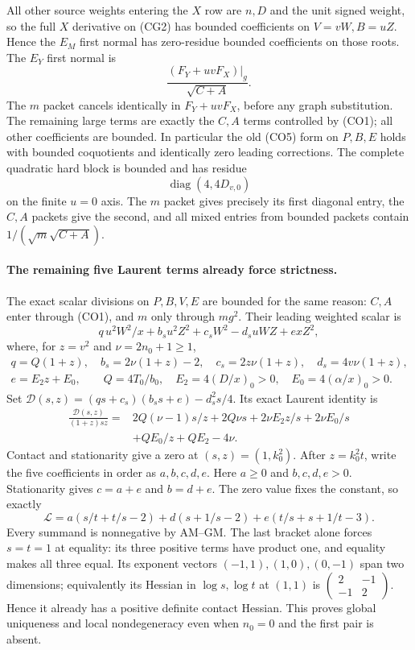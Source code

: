 All other source weights entering the $X$ row are $n,D$ and the
unit signed weight, so the full $X$ derivative on (CG2) has bounded
coefficients on $V=vW,B=uZ$.  Hence the $E_M$ first normal has
zero-residue bounded coefficients on those roots.  The $E_Y$ first
normal is
\[
       \frac{(F_Y+uvF_X)|_g}{\sqrt{C+A}}.               \tag{CG4}
\]
The $m$ packet cancels identically in $F_Y+uvF_X$, before any graph
substitution.  The remaining large terms are exactly the $C,A$
terms controlled by (CO1); all other coefficients are bounded.
In particular the old (CO5) form on $P,B,E$ holds with bounded
coquotients and identically zero leading corrections.
The complete quadratic hard block is bounded and has residue
\[
                         \operatorname{diag}(4,4D_{v,0})  \tag{CG5}
\]
on the finite $u=0$ axis.  The $m$ packet gives precisely its first
diagonal entry, the $C,A$ packets give the second, and all mixed
entries from bounded packets contain $1/(\sqrt m\sqrt{C+A})$.

\paragraph{The remaining five Laurent terms already force strictness.}
The exact scalar divisions on $P,B,V,E$ are bounded for the same
reason: $C,A$ enter through (CO1), and $m$ only through $mg^2$.
Their leading weighted scalar is
\[
 q\,u^2W^2/x+b_su^2Z^2+c_sW^2-d_suWZ+exZ^2,
\]
where, for $z=v^2$ and $\nu=2n_0+1\geq1$,
\[
 \begin{gathered}
 q=Q(1+z),\quad b_s=2\nu(1+z)-2,\quad
 c_s=2z\nu(1+z),\quad d_s=4v\nu(1+z),\\
 e=E_2z+E_0,\qquad Q=4T_0/b_0,
 \quad E_2=4(D/x)_0>0,\quad E_0=4(\alpha/x)_0>0.
 \end{gathered}                                         \tag{CG6}
\]
Set $\mathcal D(s,z)=(qs+c_s)(b_ss+e)-d_s^2s/4$.
Its exact Laurent identity is
\begin{align*}
 \frac{\mathcal D(s,z)}{(1+z)sz}={}&
 2Q(\nu-1)s/z+2Q\nu s
 +2\nu E_2z/s+2\nu E_0/s\\
 &+QE_0/z+QE_2-4\nu.                                  \tag{CG7}
\end{align*}
Contact and stationarity give a zero at $(s,z)=(1,k_0^2)$.
After $z=k_0^2t$, write the five coefficients in order as
$a,b,c,d,e$.  Here $a\geq0$ and $b,c,d,e>0$.  Stationarity gives
$c=a+e$ and $b=d+e$.  The zero value fixes the constant, so exactly
\[
 \mathcal L=
 a(s/t+t/s-2)+d(s+1/s-2)+e(t/s+s+1/t-3).                 \tag{CG8}
\]
Every summand is nonnegative by AM--GM.  The last bracket alone
forces $s=t=1$ at equality: its three positive terms have product
one, and equality makes all three equal.  Its exponent vectors
$(-1,1),(1,0),(0,-1)$ span two dimensions; equivalently its Hessian
in $\log s,\log t$ at $(1,1)$ is
$\left(\begin{smallmatrix}2&-1\\-1&2\end{smallmatrix}\right)$.
Hence it already has a positive definite contact Hessian.
This proves global uniqueness and local nondegeneracy even when
$n_0=0$ and the first pair is absent.

